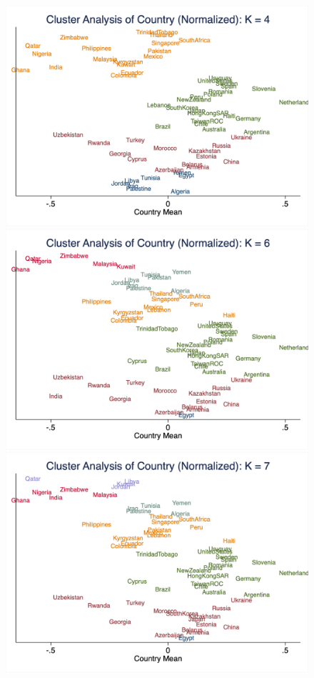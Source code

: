 \documentclass[10pt,leqno]{article}
\begin{document}
\begin{figure}  [h!]
\begin{center}
\includegraphics[scale=0.15]{CA_CountryK4_NOR.png}
\includegraphics[scale=0.15]{CA_CountryK6_NOR.png}
\includegraphics[scale=0.15]{CA_CountryK7_NOR.png}

\end{center}
\end{figure}
\end{document}
